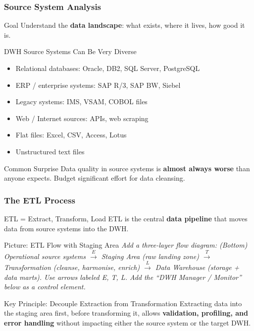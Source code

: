 \begin{frame}
  \frametitle{Source System Analysis}

  \begin{block}{Goal}
    Understand the \textbf{data landscape}: what exists, where it lives,
    how good it is.
  \end{block}

  \begin{block}{DWH Source Systems Can Be Very Diverse}
    \begin{itemize}
      \item Relational databases: Oracle, DB2, SQL Server, PostgreSQL
      \item ERP / enterprise systems: SAP R/3, SAP BW, Siebel
      \item Legacy systems: IMS, VSAM, COBOL files
      \item Web / Internet sources: APIs, web scraping
      \item Flat files: Excel, CSV, Access, Lotus
      \item Unstructured text files
    \end{itemize}
  \end{block}

  \begin{alertblock}{Common Surprise}
    Data quality in source systems is \textbf{almost always worse} than
    anyone expects. Budget significant effort for data cleansing.
  \end{alertblock}
\end{frame}


\begin{frame}
  \frametitle{The ETL Process}

  \begin{block}{ETL = Extract, Transform, Load}
    ETL is the central \textbf{data pipeline} that moves data from source
    systems into the DWH.
  \end{block}

  \begin{alertblock}{Picture: ETL Flow with Staging Area}
    \textit{Add a three-layer flow diagram:
    (Bottom) Operational source systems
    $\xrightarrow{E}$ Staging Area (raw landing zone)
    $\xrightarrow{T}$ Transformation (cleanse, harmonise, enrich)
    $\xrightarrow{L}$ Data Warehouse (storage + data marts).
    Use arrows labeled E, T, L. Add the ``DWH Manager / Monitor'' below
    as a control element.}
  \end{alertblock}

  \begin{block}{Key Principle: Decouple Extraction from Transformation}
    Extracting data into the staging area first, before transforming it,
    allows \textbf{validation, profiling, and error handling} without
    impacting either the source system or the target DWH.
  \end{block}
\end{frame}

